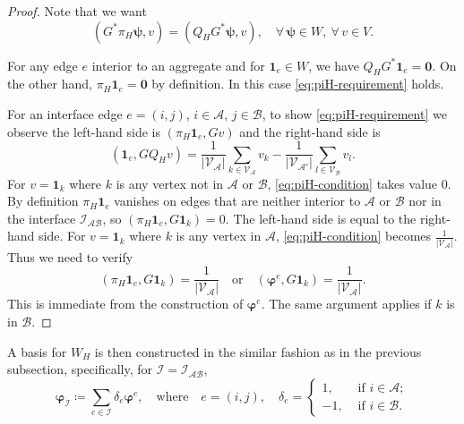 \documentclass[ ]{elsarticle}
\newcommand{\cA}{\mathcal{A}}
\newcommand{\cB}{\mathcal{B}}
\newcommand{\cI}{\mathcal{I}}
\newcommand{\cV}{\mathcal{V}}
\newcommand{\mforall}{\forall\,}
\newcommand{\Grad}{G}
\newcommand{\Div}{G^*}
\newcommand{\vsp}{V}
\newcommand{\esp}{W}
\newcommand{\vone}{\mathbf{1}}
\newcommand{\eone}{\mathbf{1}}
\numberwithin{equation}{section}
\begin{document}
\begin{proof}
  Note that we want
  \begin{equation}\label{eq:piH-requirement}
    (\Div\pi_H\bm\psi,v)=(Q_H\Div\bm\psi,v),
    \quad \mforall \bm\psi\in\esp, \ \mforall v\in\vsp.
  \end{equation}
  
  For any edge $e$ interior to an aggregate and for $\eone_e\in\esp$,
  we have $Q_H\Grad^*\eone_e = \bm0$. On the other hand,
  $\pi_H\eone_e = \bm0$ by definition. In this case
  \eqref{eq:piH-requirement} holds.

  For an interface edge $e=(i,j)$, $i\in\cA$, $j\in\cB$, to show
  \eqref{eq:piH-requirement} we observe the left-hand side is
  $(\pi_H\eone_{e}, \Grad v)$ and the right-hand side is
  \begin{equation}\label{eq:piH-condition}
    (\eone_{e}, \Grad Q_Hv)
    = \frac{1}{\lvert\cV_\cA\rvert}\sum_{k\in\cV_\cA}v_k -
    \frac{1}{\lvert\cV_{\cA'}\rvert}\sum_{l\in\cV_{\cB}}v_l.
  \end{equation}
  For $v = \vone_k$ where $k$ is any vertex not in $\cA$ or $\cB$,
  \eqref{eq:piH-condition} takes value 0. By definition $\pi_H\eone_e$
  vanishes on edges that are neither interior to $\cA$ or $\cB$ nor in
  the interface $\cI_{\cA\cB}$, so
  $(\pi_H\eone_{e}, \Grad\vone_k) = 0$. The left-hand side is equal to
  the right-hand side. For $v = \vone_k$ where $k$ is any vertex in
  $\cA$, \eqref{eq:piH-condition} becomes
  $\frac{1}{\lvert\cV_\cA\rvert}$. Thus we need to verify
  \begin{equation*}
    (\pi_H\eone_e, \Grad\vone_k) = \frac{1}{\lvert\cV_\cA\rvert}
    \quad\text{or}\quad
    (\bm\varphi^e, \Grad\vone_k) = \frac{1}{\lvert\cV_\cA\rvert}.
  \end{equation*}
  This is immediate from the construction of $\bm\varphi^e$. The same
  argument applies if $k$ is in $\cB$.
\end{proof}

A basis for $\esp_H$ is then constructed in the similar fashion as in
the previous subsection, specifically, for $\cI = \cI_{\cA\cB}$,
\begin{equation*}
  \bm\varphi_\cI \coloneqq \sum_{e\in\cI}\delta_e\bm\varphi^e,
  \quad \text{where} \quad e=(i,j), \quad
  \delta_e =
  \begin{cases}
    1,  & \text{ if } i \in \cA; \\
    -1, & \text{ if } i \in \cB.
  \end{cases}
\end{equation*}
\end{document}
